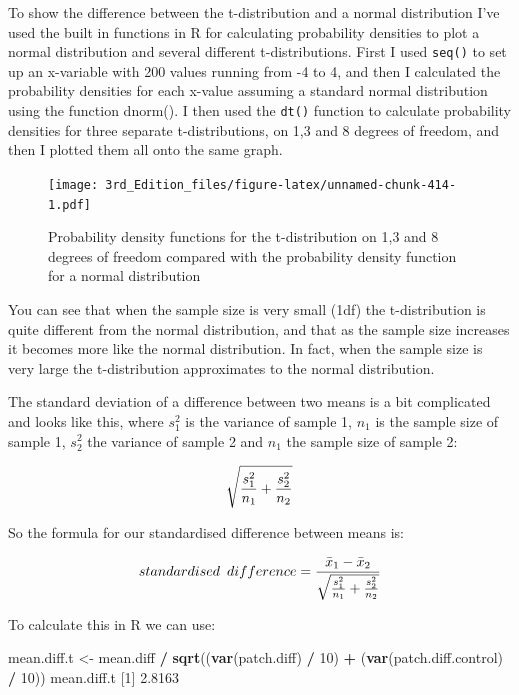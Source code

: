 \documentclass[
]{book}
\newenvironment{Shaded}{\begin{snugshade}}{\end{snugshade}}
\newcommand{\DecValTok}[1]{\textcolor[rgb]{0.00,0.00,0.81}{#1}}
\newcommand{\FloatTok}[1]{\textcolor[rgb]{0.00,0.00,0.81}{#1}}
\newcommand{\KeywordTok}[1]{\textcolor[rgb]{0.13,0.29,0.53}{\textbf{#1}}}
\newcommand{\NormalTok}[1]{#1}
\newcommand{\OperatorTok}[1]{\textcolor[rgb]{0.81,0.36,0.00}{\textbf{#1}}}
\newcommand{\StringTok}[1]{\textcolor[rgb]{0.31,0.60,0.02}{#1}}
\begin{document}
To show the difference between the t-distribution and a normal distribution I've used the built in functions in R for calculating probability densities to plot a normal distribution and several different t-distributions. First I used \texttt{seq()} to set up an x-variable with 200 values running from -4 to 4, and then I calculated the probability densities for each x-value assuming a standard normal distribution using the function dnorm(). I then used the \texttt{dt()} function to calculate probability densities for three separate t-distributions, on 1,3 and 8 degrees of freedom, and then I plotted them all onto the same graph.

\begin{figure}
\centering
\texttt{[image: 3rd\_Edition\_files/figure-latex/unnamed-chunk-414-1.pdf]}
\caption{\label{fig:unnamed-chunk-414}Probability density functions for the t-distribution on 1,3 and 8 degrees of freedom compared with the probability density function for a normal distribution}
\end{figure}

You can see that when the sample size is very small (1df) the t-distribution is quite different from the normal distribution, and that as the sample size increases it becomes more like the normal distribution. In fact, when the sample size is very large the t-distribution approximates to the normal distribution.

The standard deviation of a difference between two means is a bit complicated and looks like this, where \(s^{2}_{1}\) is the variance of sample 1, \(n_{1}\) is the sample size of sample 1, \(s^{2}_{2}\) the variance of sample 2 and \(n_{1}\) the sample size of sample 2:

\[\Large \sqrt{\frac{s^{2}_{1}}{n_1} + \frac{s^{2}_{2}}{n_2}}\]

So the formula for our standardised difference between means is:

\[\Large standardised\;\: difference  = \frac{\bar{x}_{1} - \bar{x}_{2}}{\sqrt{\frac{s^{2}_{1}}{n_1} + \frac{s^{2}_{2}}{n_2}}}\]

To calculate this in R we can use:

\begin{Shaded}
\begin{Highlighting}[]
\NormalTok{mean.diff.t <-}
\StringTok{  }\NormalTok{mean.diff }\OperatorTok{/}\StringTok{ }\KeywordTok{sqrt}\NormalTok{((}\KeywordTok{var}\NormalTok{(patch.diff) }\OperatorTok{/}\StringTok{ }\DecValTok{10}\NormalTok{) }\OperatorTok{+}\StringTok{ }
\StringTok{                     }\NormalTok{(}\KeywordTok{var}\NormalTok{(patch.diff.control) }\OperatorTok{/}\StringTok{ }\DecValTok{10}\NormalTok{))}
\NormalTok{mean.diff.t}
\NormalTok{[}\DecValTok{1}\NormalTok{] }\FloatTok{2.8163}
\end{Highlighting}
\end{Shaded}
\end{document}
